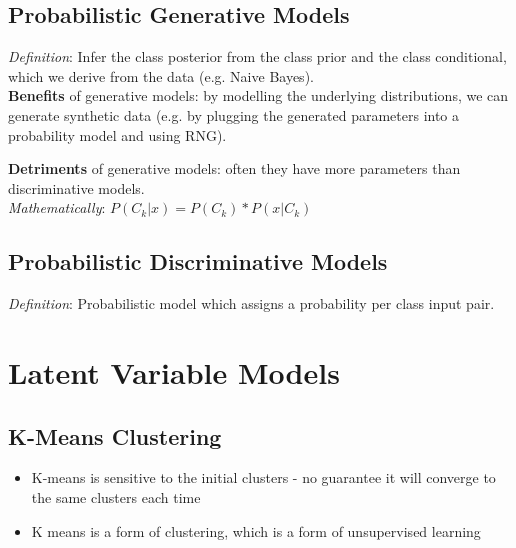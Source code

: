 \documentclass[a4paper]{article}
\begin{document}
	\subsection{Probabilistic Generative Models}
	\textit{Definition}: Infer the class posterior from the class prior and the class conditional, which we derive from the data (e.g. Naive Bayes). \\
	 
	
	\textbf{Benefits} of generative models: by modelling the underlying distributions, we can generate synthetic data (e.g. by plugging the generated parameters into a probability model and using RNG).
	
	\textbf{Detriments} of generative models: often they have more parameters than discriminative models. \\ 
	
	\textit{Mathematically}: $P(C_k | x) = P(C_k) * P(x | C_k)$ \\ 
	
	
	
	\subsection{Probabilistic Discriminative Models}
	\textit{Definition}: Probabilistic model which assigns a probability per class input pair.
	
	
	\clearpage
	\section{Latent Variable Models}
	
	\subsection{K-Means Clustering}
	
	\begin{itemize}
		\item K-means is sensitive to the initial clusters - no guarantee it will converge to the same clusters each time
		\item K means is a form of clustering, which is a form of unsupervised learning
	\end{itemize}
	
\end{document}
